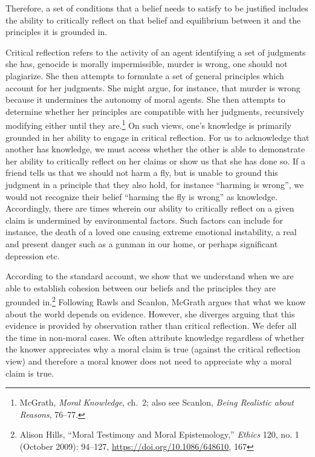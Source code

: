 \documentclass[
  12pt,
]{book}
\theoremstyle{definition}
\theoremstyle{definition}
\theoremstyle{definition}
\theoremstyle{definition}
\theoremstyle{remark}
\begin{document}
\label{refl-equi}
Therefore, a set of conditions that a belief needs to satisfy to be justified includes the ability to critically reflect on that belief and equilibrium between it and the principles it is grounded in.

Critical reflection refers to the activity of an agent identifying a set of judgments she has, genocide is morally impermissible, murder is wrong, one should not plagiarize. She then attempts to formulate a set of general principles which account for her judgments. She might argue, for instance, that murder is wrong because it undermines the autonomy of moral agents. She then attempts to determine whether her principles are compatible with her judgments, recursively modifying either until they are.\footnote{McGrath, \emph{Moral {Knowledge}}, ch.~2; also see Scanlon, \emph{Being Realistic about Reasons}, 76--77.} On such views, one's knowledge is primarily grounded in her ability to engage in critical reflection. For us to acknowledge that another has knowledge, we must access whether the other is able to demonstrate her ability to critically reflect on her claims or show us that she has done so. If a friend tells us that we should not harm a fly, but is unable to ground this judgment in a principle that they also hold, for instance ``harming is wrong'', we would not recognize their belief ``harming the fly is wrong'' as knowledge. Accordingly, there are times wherein our ability to critically reflect on a given claim is undermined by environmental factors. Such factors can include for instance, the death of a loved one causing extreme emotional instability, a real and present danger such as a gunman in our home, or perhaps significant depression etc.

According to the standard account, we show that we understand when we are able to establish cohesion between our beliefs and the principles they are grounded in.\footnote{Alison Hills, {``Moral Testimony and Moral Epistemology,''} \emph{Ethics} 120, no. 1 (October 2009): 94--127, \url{https://doi.org/10.1086/648610}, 167} Following Rawls and Scanlon, McGrath argues that what we know about the world depends on evidence. However, she diverges arguing that this evidence is provided by observation rather than critical reflection. We defer all the time in non-moral cases. We often attribute knowledge regardless of whether the knower appreciates why a moral claim is true (against the critical reflection view) and therefore a moral knower does not need to appreciate why a moral claim is true.
\end{document}
